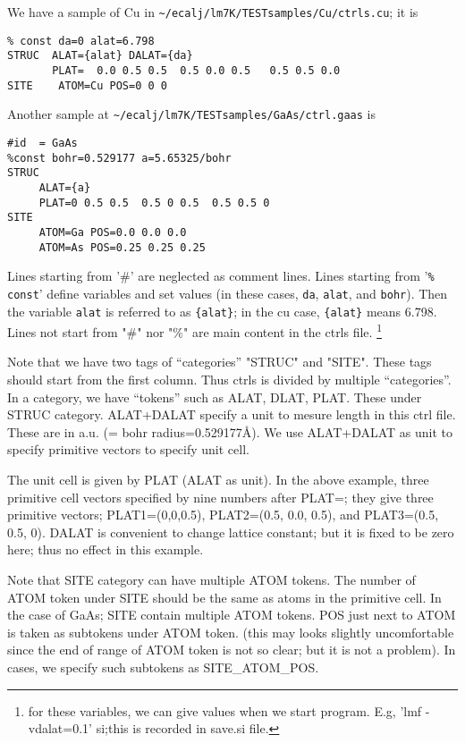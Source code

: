 \documentclass[a4paper,10pt,epsf,fleqn]{article}
\begin{document}
We have a sample of Cu in \verb+~/ecalj/lm7K/TESTsamples/Cu/ctrls.cu+; it is
\begin{verbatim}
% const da=0 alat=6.798
STRUC  ALAT={alat} DALAT={da}
       PLAT=  0.0 0.5 0.5  0.5 0.0 0.5   0.5 0.5 0.0
SITE    ATOM=Cu POS=0 0 0
\end{verbatim}

Another sample at \verb+~/ecalj/lm7K/TESTsamples/GaAs/ctrl.gaas+ is
\begin{verbatim}
#id  = GaAs
%const bohr=0.529177 a=5.65325/bohr 
STRUC
     ALAT={a} 
     PLAT=0 0.5 0.5  0.5 0 0.5  0.5 0.5 0 
SITE
     ATOM=Ga POS=0.0 0.0 0.0
     ATOM=As POS=0.25 0.25 0.25
\end{verbatim}

Lines starting from '\#' are neglected as comment lines.
Lines starting from '\verb+% const+' define variables and set values
(in these cases, \verb+da+, \verb+alat+, and \verb+bohr+). 
Then the variable \verb+alat+ is referred to as \verb+{alat}+; in the cu case,
\verb+{alat}+ means 6.798.
Lines not start from "\#" nor "\%" are main content in the ctrls file.
\footnote{for these variables, we can give values when we start
program. E.g, 'lmf -vdalat=0.1' si;this is recorded in save.si file.}

Note that we have two tags of ``categories'' "STRUC" and "SITE". 
These tags should start from the first column. 
Thus ctrls is divided by multiple ``categories''.
In a category, we have ``tokens'' such as ALAT, DLAT, PLAT. 
These under STRUC category. 
ALAT+DALAT specify a unit to mesure length in this ctrl file.
These are in a.u. (= bohr radius=0.529177\AA). 
We use ALAT+DALAT as unit to specify primitive vectors to specify unit cell.

The unit cell is given by PLAT (ALAT as unit).
In the above example, three primitive cell vectors specified by nine
numbers after PLAT=; they give three primitive vectors;
PLAT1=(0,0,0.5), PLAT2=(0.5, 0.0, 0.5), and PLAT3=(0.5, 0.5, 0). 
DALAT is convenient to change lattice constant; but it is fixed to be
zero here; thus no effect in this example.

Note that SITE category can have multiple ATOM tokens. The number of
ATOM token under SITE should be  the same as atoms in the primitive cell.
In the case of GaAs; SITE contain multiple ATOM tokens.
POS just next to ATOM is taken as subtokens under ATOM token. 
(this may looks slightly uncomfortable since the end of range of ATOM
 token is not so clear; but it is not a problem).
In cases, we specify such subtokens as SITE\_ATOM\_POS.
\end{document}
